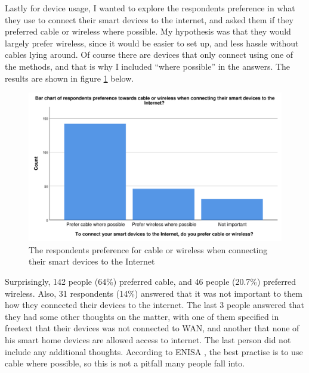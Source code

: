 Lastly for device usage, I wanted to explore the respondents preference in what they use to connect their smart devices to the internet, and asked them if they preferred cable or wireless where possible. My hypothesis was that they would largely prefer wireless, since it would be easier to set up, and less hassle without cables lying around. Of course there are devices that only connect using one of the methods, and that is why I included ``where possible'' in the answers. The results are shown in figure \ref{fig:connect_internet} below. 
\begin{figure}[!h]
    \centering
    \includegraphics[scale=0.55]{figures/diagrams/connect_internet.pdf}
    \caption{The respondents preference for cable or wireless when connecting their smart devices to the Internet}
    \label{fig:connect_internet}
\end{figure}
Surprisingly, 142 people (64\%) preferred cable, and 46 people (20.7\%) preferred wireless. Also, 31 respondents (14\%) answered that it was not important to them how they connected their devices to the internet. The last 3 people answered that they had some other thoughts on the matter, with one of them specified in freetext that their devices was not connected to WAN, and another that none of his smart home devices are allowed access to internet. The last person did not include any additional thoughts. According to ENISA \cite{ENISA2015SmartHome}, the best practise is to use cable where possible, so this is not a pitfall many people fall into. 

